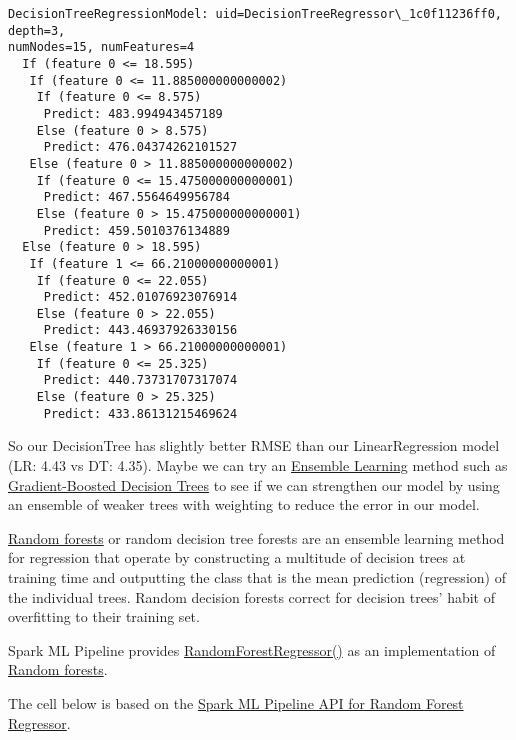 \documentclass[11pt]{article}
\begin{document}
    \begin{Verbatim}[commandchars=\\\{\}]
DecisionTreeRegressionModel: uid=DecisionTreeRegressor\_1c0f11236ff0, depth=3,
numNodes=15, numFeatures=4
  If (feature 0 <= 18.595)
   If (feature 0 <= 11.885000000000002)
    If (feature 0 <= 8.575)
     Predict: 483.994943457189
    Else (feature 0 > 8.575)
     Predict: 476.04374262101527
   Else (feature 0 > 11.885000000000002)
    If (feature 0 <= 15.475000000000001)
     Predict: 467.5564649956784
    Else (feature 0 > 15.475000000000001)
     Predict: 459.5010376134889
  Else (feature 0 > 18.595)
   If (feature 1 <= 66.21000000000001)
    If (feature 0 <= 22.055)
     Predict: 452.01076923076914
    Else (feature 0 > 22.055)
     Predict: 443.46937926330156
   Else (feature 1 > 66.21000000000001)
    If (feature 0 <= 25.325)
     Predict: 440.73731707317074
    Else (feature 0 > 25.325)
     Predict: 433.86131215469624

    \end{Verbatim}

    So our DecisionTree has slightly better RMSE than our LinearRegression
model (LR: 4.43 vs DT: 4.35). Maybe we can try an
\href{https://en.wikipedia.org/wiki/Ensemble_learning}{Ensemble
Learning} method such as
\href{https://en.wikipedia.org/wiki/Gradient_boosting}{Gradient-Boosted
Decision Trees} to see if we can strengthen our model by using an
ensemble of weaker trees with weighting to reduce the error in our
model.

\href{https://en.wikipedia.org/wiki/Random_forest}{Random forests} or
random decision tree forests are an ensemble learning method for
regression that operate by constructing a multitude of decision trees at
training time and outputting the class that is the mean prediction
(regression) of the individual trees. Random decision forests correct
for decision trees' habit of overfitting to their training set.

Spark ML Pipeline provides
\href{https://spark.apache.org/docs/latest/api/python/reference/api/pyspark.ml.regression.RandomForestRegressor.html?highlight=randomforestregressor\#pyspark.ml.regression.RandomForestRegressor}{RandomForestRegressor()}
as an implementation of
\href{https://en.wikipedia.org/wiki/Random_forest}{Random forests}.

The cell below is based on the
\href{https://spark.apache.org/docs/latest/api/python/reference/api/pyspark.ml.regression.RandomForestRegressor.html?highlight=randomforestregressor\#pyspark.ml.regression.RandomForestRegressor}{Spark
ML Pipeline API for Random Forest Regressor}.
\end{document}
